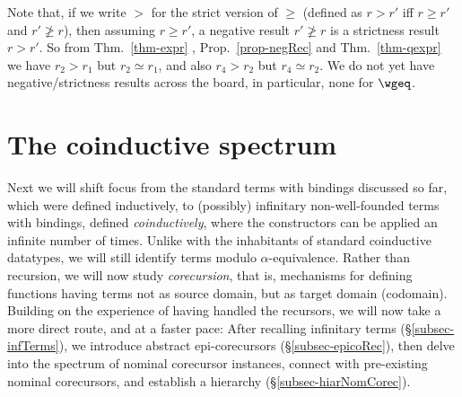 \medskip 
Note that, if we write $>$ for the strict version of $\geq$ (defined as 
$r > r'$ iff $r \geq r'$ and $r' \not\geq r$), then assuming $r \geq r'$, a negative 
result $r' \not\geq r$ is a strictness result $r > r'$.  So from Thm.~\ref{thm-expr} , Prop.~\ref{prop-negRec} and Thm.~\ref{thm-qexpr} 
we have $r_2 > r_1$ but $r_2 \simeq r_1$, and also $r_4 > r_2$ 
but $r_4 \simeq r_2$. 
%
We do not yet have negative/strictness results across the board, in particular, 
none for $\wgeq$.  



\section{The coinductive spectrum} %
\label{sec-co}

Next we will shift focus from the standard terms with bindings discussed so far, which were defined inductively, 
to (possibly) infinitary non-well-founded terms with bindings, defined \emph{coinductively}, where the constructors %
can be applied an infinite number of times. Unlike with the inhabitants of standard coinductive datatypes, we will still identify terms modulo  $\alpha$-equivalence. Rather than recursion, we will now study \emph{corecursion}, that is, mechanisms for defining functions having terms not as source domain, but as target domain (codomain). 
%
Building on the experience of having handled the recursors, 
we will now take a more direct route, and at a faster pace:
After recalling infinitary terms (\S\ref{subsec-infTerms}), 
we %
introduce abstract epi-corecursors (\S\ref{subsec-epicoRec}), 
then delve into the spectrum of nominal corecursor instances, connect with pre-existing nominal corecursors, and establish a hierarchy  
(\S\ref{subsec-hiarNomCorec}).
%

